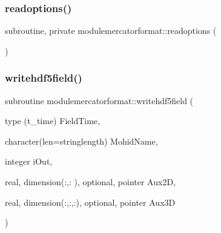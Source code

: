 \subsubsection{\texorpdfstring{readoptions()}{readoptions()}}
{\footnotesize\ttfamily subroutine, private modulemercatorformat\+::readoptions (\begin{DoxyParamCaption}{ }\end{DoxyParamCaption})\hspace{0.3cm}{\ttfamily [private]}}

\mbox{\label{namespacemodulemercatorformat_a0b4f8793ec9ff2e27a2372febde0eac4}} 
\subsubsection{\texorpdfstring{writehdf5field()}{writehdf5field()}}
{\footnotesize\ttfamily subroutine modulemercatorformat\+::writehdf5field (\begin{DoxyParamCaption}\item[{type (t\+\_\+time)}]{Field\+Time,  }\item[{character(len=stringlength)}]{Mohid\+Name,  }\item[{integer}]{i\+Out,  }\item[{real, dimension(\+:,\+:  ), optional, pointer}]{Aux2D,  }\item[{real, dimension(\+:,\+:,\+:), optional, pointer}]{Aux3D }\end{DoxyParamCaption})\hspace{0.3cm}{\ttfamily [private]}}

